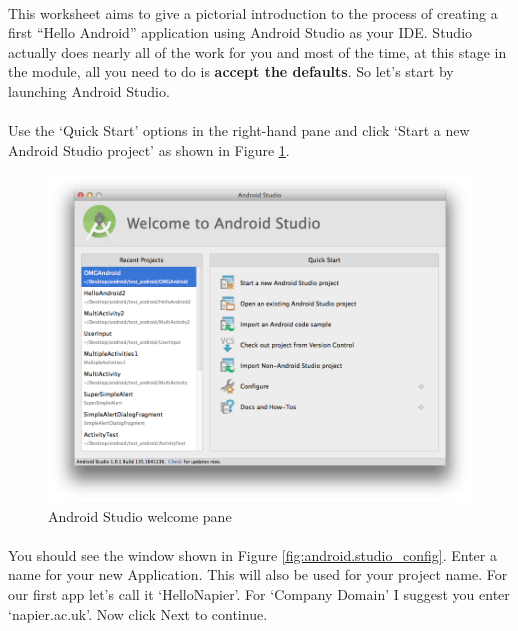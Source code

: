 \paragraph{} This worksheet aims to give a pictorial introduction to the process of creating a first ``Hello Android'' application using Android Studio as your IDE. Studio actually does nearly all of the work for you and most of the time, at this stage in the module, all you need to do is {\bf{accept the defaults}}. So let's start by launching Android Studio.

\paragraph{} Use the `Quick Start' options in the right-hand pane and click `Start a new Android Studio project' as shown in Figure \ref{fig:android.studio_welcome}.

\begin{figure}[H]
\centering
\includegraphics[width=\textwidth]{images/android-studio_01_welcome}
\caption{Android Studio welcome pane}
\label{fig:android.studio_welcome}
\end{figure}

\paragraph{} You should see the window shown in Figure \ref{fig:android.studio_config}. Enter a name for your new Application. This will also be used for your project name. For our first app let's call it `HelloNapier'. For `Company Domain' I suggest you enter `napier.ac.uk'. Now click Next to continue.

